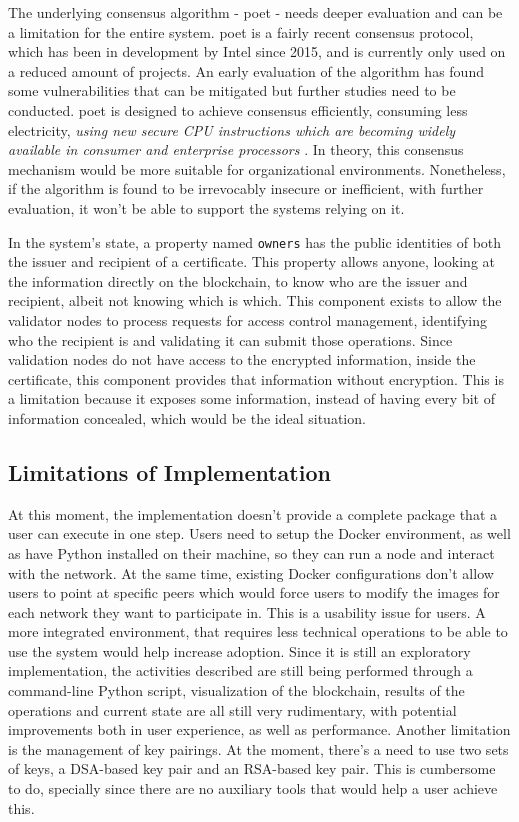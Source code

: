 The underlying consensus algorithm - \gls{poet} - needs deeper evaluation and can be a limitation for the entire system. \gls{poet} is a fairly recent consensus protocol, which has been in development by Intel since 2015, and is currently only used on a reduced amount of projects. An early evaluation of the algorithm has found some vulnerabilities that can be mitigated \cite{chen_security_2017} but further studies need to be conducted. \gls{poet} is designed to achieve consensus efficiently, consuming less electricity, \emph{using new secure CPU instructions which are becoming widely available in consumer and enterprise processors} \cite{intel_poet}. In theory, this consensus mechanism would be more suitable for organizational environments. Nonetheless, if the algorithm is found to be irrevocably insecure or inefficient, with further evaluation, it won't be able to support the systems relying on it.

In the system's state, a property named \texttt{owners} has the public identities of both the issuer and recipient of a certificate. This property allows anyone, looking at the information directly on the blockchain, to know who are the issuer and recipient, albeit not knowing which is which. This component exists to allow the validator nodes to process requests for access control management, identifying who the recipient is and validating it can submit those operations. Since validation nodes do not have access to the encrypted information, inside the certificate, this component provides that information without encryption. This is a limitation because it exposes some information, instead of having every bit of information concealed, which would be the ideal situation.

\subsection{Limitations of Implementation}

At this moment, the implementation doesn't provide a complete package that a user can execute in one step. Users need to setup the Docker environment, as well as have Python installed on their machine, so they can run a node and interact with the network. At the same time, existing Docker configurations don't allow users to point at specific peers which would force users to modify the images for each network they want to participate in. This is a usability issue for users. A more integrated environment, that requires less technical operations to be able to use the system would help increase adoption. Since it is still an exploratory implementation, the activities described are still being performed through a command-line Python script, visualization of the blockchain, results of the operations and current state are all still very rudimentary, with potential improvements both in user experience, as well as performance. Another limitation is the management of key pairings. At the moment, there's a need to use two sets of keys, a DSA-based key pair and an RSA-based key pair. This is cumbersome to do, specially since there are no auxiliary tools that would help a user achieve this.